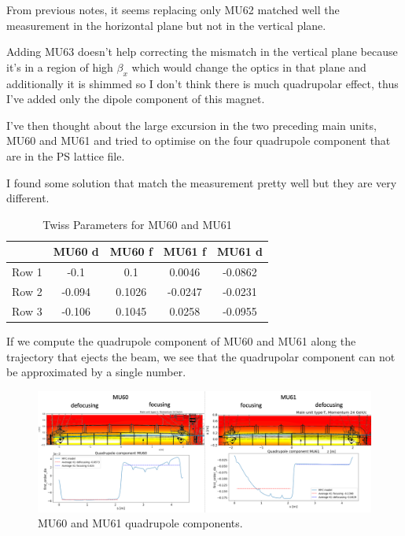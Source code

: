 From previous notes, it seems replacing only MU62 matched well the measurement in the horizontal plane but not in the vertical plane.

Adding MU63 doesn't help correcting the mismatch in the vertical plane because it's in a region of high $\beta_{x}$ which would change the optics in that plane and additionally it is shimmed so I don't think there is much quadrupolar effect, thus I've added only the dipole component of this magnet.

I've then thought about the large excursion in the two preceding main units, MU60 and MU61 and tried to optimise on the four quadrupole component that are in the PS lattice file.

I found some solution that match the measurement pretty well but they are very different.

\begin{table}[ht]
    \centering
    \caption{Twiss Parameters for MU60 and MU61}
    \begin{tabular}{l c c c c}
        \hline
        & \textbf{MU60 d} & \textbf{MU60 f} & \textbf{MU61 f} & \textbf{MU61 d} \\
        \hline
        Row 1 & -0.1 & 0.1 & 0.0046 & -0.0862 \\
        Row 2 & -0.094 & 0.1026 & -0.0247 & -0.0231 \\
        Row 3 & -0.106 & 0.1045 & 0.0258 & -0.0955 \\
        \hline
    \end{tabular}
    \label{tab:twiss_parameters_mu60_mu61}
\end{table}



If we compute the quadrupole component of MU60 and MU61 along the trajectory that ejects the beam, we see that the quadrupolar component can not be approximated by a single number.

\begin{figure}[H]
\centering
\includegraphics[width=1.0\textwidth]{02_Simulation/images/mu60_mu61_quad_comp.png}
\caption{MU60 and MU61 quadrupole components.}
\label{fig:mu60_mu61_q_comp}
\end{figure}

